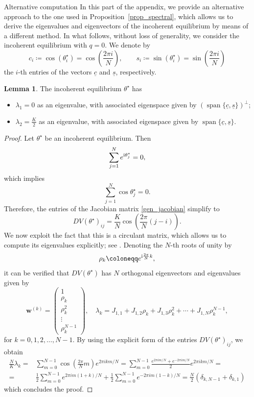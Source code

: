 \documentclass{article}
\theoremstyle{definition}
\newtheorem{lemma}[definition]{Lemma}
\renewcommand{\i}{\textnormal{i}}
\begin{document}
\begin{section}{Alternative computation}\label{App_B}
In this part of the appendix, we provide an alternative approach to the one used in Proposition~\ref{prop_spectral}, which allows us to derive the eigenvalues and eigenvectors of the incoherent equilibrium by means of a different method.  In what follows, without loss of generality, we consider the incoherent equilibrium with $q=0$. We denote by
$$c_i\coloneqq\cos(\theta^\star_i)=\cos\left(\frac{2\pi i}{N}\right),\qquad 
s_i\coloneqq\sin(\theta^\star_i)=\sin\left(\frac{2\pi i}{N}\right)$$
the $i$-th entries of the vectors $\underline{c}$ and $\underline{s}$, respectively.

\begin{lemma}
    The incoherent equilibrium $\theta^\star$ has 
    \begin{itemize}
        \item $\lambda_1=0$ as an eigenvalue, with associated eigenspace given by $(\operatorname{span}\{\underline{c},\underline{s}\})^\perp$;
        \item $\lambda_2=\frac{K}{2}$ as an eigenvalue, with associated eigenspace given by $\operatorname{span}\{\underline{c},\underline{s}\}$.
    \end{itemize}
\end{lemma}

\begin{proof}
    Let $\theta^\star$ be an incoherent equilibrium. Then
$$\sum_{j=1}^Ne^{\i\theta^\star_j}=0,$$
which implies
$$\sum_{j=1}^N \cos{\theta^\star_j}=0.$$
Therefore, the entries of the Jacobian matrix \eqref{gen_jacobian} simplify to 
$$DV(\theta^\star)_{ij}=\frac{K}{N}\cos\left(\frac{2\pi}{N}(j-i)\right).$$
We now exploit the fact that this is a circulant matrix, which allows us to compute its eigenvalues explicitly; see \cite{tee2005eigenvectors}. Denoting the $N$-th roots of unity by
$$\rho_k\coloneqq e^{\i\frac{2\pi}{N}k},$$
it can be verified that $DV(\theta^\star)$ has $N$ orthogonal eigenvectors and eigenvalues given by
$$
\mathbf{w}^{(k)}=\left(\begin{array}{l}
1 \\
\rho_k \\
\rho_k^2 \\
\vdots \\
\rho_k^{N-1}
\end{array}\right), \quad 
\lambda_k=J_{1,1}+J_{1,2} \rho_k+J_{1,3}\rho_k^2+\cdots+J_{1,N} \rho_k^{N-1},
$$
for $k=0,1,2,\ldots,N-1$. By using the explicit form of the entries $DV(\theta^\star)_{ij}$, we obtain
\begin{align*}
    \frac{N}{K}\lambda_k=&\sum_{m=0}^{N-1} \cos \left(\frac{2 \pi}{N} m\right) e^{2 \pi i k m / N}=\sum_{m=0}^{N-1} \frac{e^{2 \pi i m / N}+e^{-2 \pi i m / N}}{2} e^{2 \pi i k m / N}=\\
    =&\frac{1}{2} \sum_{m=0}^{N-1} e^{2 \pi im(1+k) / N}+\frac{1}{2} \sum_{m=0}^{N-1} e^{-2 \pi im(1-k) / N}=\frac{N}{2}\left(\delta_{k, N-1}+\delta_{k, 1}\right)
\end{align*}
which concludes the proof.
\end{proof}
\end{section}
\end{document}
